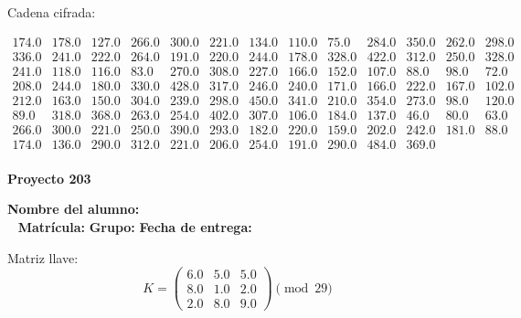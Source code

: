 \documentclass[12pt]{article}
\begin{document}
Cadena cifrada:
\begin{center}
$\begin{array}{lllllllllllll}
174.0 & 178.0 & 127.0 & 266.0 & 300.0 & 221.0 & 134.0 & 110.0 & 75.0 & 284.0 & 350.0 & 262.0 & 298.0\\
336.0 & 241.0 & 222.0 & 264.0 & 191.0 & 220.0 & 244.0 & 178.0 & 328.0 & 422.0 & 312.0 & 250.0 & 328.0\\
241.0 & 118.0 & 116.0 & 83.0 & 270.0 & 308.0 & 227.0 & 166.0 & 152.0 & 107.0 & 88.0 & 98.0 & 72.0\\
208.0 & 244.0 & 180.0 & 330.0 & 428.0 & 317.0 & 246.0 & 240.0 & 171.0 & 166.0 & 222.0 & 167.0 & 102.0\\
212.0 & 163.0 & 150.0 & 304.0 & 239.0 & 298.0 & 450.0 & 341.0 & 210.0 & 354.0 & 273.0 & 98.0 & 120.0\\
89.0 & 318.0 & 368.0 & 263.0 & 254.0 & 402.0 & 307.0 & 106.0 & 184.0 & 137.0 & 46.0 & 80.0 & 63.0\\
266.0 & 300.0 & 221.0 & 250.0 & 390.0 & 293.0 & 182.0 & 220.0 & 159.0 & 202.0 & 242.0 & 181.0 & 88.0\\
174.0 & 136.0 & 290.0 & 312.0 & 221.0 & 206.0 & 254.0 & 191.0 & 290.0 & 484.0 & 369.0\\
\end{array}$
\end{center}

\newpage


\textbf{Proyecto 203}

\textbf{Nombre del alumno:} \underline{\hspace{13cm}}\\\
\vspace{1cm}
\textbf{Matrícula:} \underline{\hspace{4cm}} \hspace{1cm}
\textbf{Grupo:} \underline{\hspace{2cm}}
\textbf{Fecha de entrega:} \underline{\hspace{2cm}}

\medskip

Matriz llave:
\[
K = \begin{pmatrix}
6.0 & 5.0 & 5.0\\
8.0 & 1.0 & 2.0\\
2.0 & 8.0 & 9.0
\end{pmatrix} \pmod{29}
\]
\end{document}

